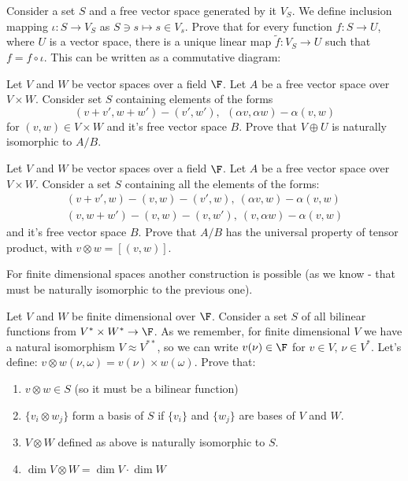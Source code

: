 \begin{prob}
  Consider a set $S$ and a free vector space generated by it $V_S$. We define inclusion mapping $\iota : S\to V_S$ as $S\ni s \mapsto s\in V_s$. Prove that for every function
  $f: S\to U$, where $U$ is a vector space, there is a unique linear map $\tilde f: V_S\to U$ such that $f=f\circ \iota$. This can be written as a commutative diagram:

  \begin{figure}
    \centering
  \end{figure}
\end{prob}

\begin{prob}
  Let $V$ and $W$ be vector spaces over a field $\F$. Let $A$ be a free vector space over $V\times W$.
  Consider set $S$ containing elements of the forms
  $$(v+v',w+w')-(v', w'),~~(\alpha v, \alpha w)-\alpha (v,w)$$
  for $(v,w) \in V\times W$ and it's free vector space $B$.
  Prove that $V\oplus U$ is naturally isomorphic to $A/B$.
\end{prob}

\begin{prob}
  Let $V$ and $W$ be vector spaces over a field $\F$. Let $A$ be a free vector space over $V\times W$. Consider a set $S$ containing all the elements of the forms:
  \begin{align}
    (v+v',w)-(v,w)-(v',w),~(\alpha v, w)-\alpha(v,w)\\
    (v,w+w')-(v,w)-(v,w'),~(v, \alpha w)-\alpha(v,w)
  \end{align}
  and it's free vector space $B$. Prove that $A/B$ has the universal property of tensor product, with $v\otimes w = [(v,w)]$.
\end{prob}

For finite dimensional spaces another construction is possible (as we know - that must be naturally isomorphic to the previous one).

\begin{prob}
  Let $V$ and $W$ be finite dimensional over $\F$.
  Consider a set $S$ of all bilinear functions from $V^*\times W^*\to \F$. As we remember, for finite dimensional $V$ we have a natural isomorphism $V\approx V^{**}$,
  so we can write $v(\nu)\in \F$ for $v\in V,\,\nu\in V^*$. Let's define: $v\otimes w(\nu, \omega) = v(\nu)\times w(\omega)$. Prove that:
  \begin{enumerate}
    \item $v\otimes w\in S$ (so it must be a bilinear function)
    \item $\{v_i\otimes w_j\}$ form a basis of $S$ if $\{v_i\}$ and $\{w_j\}$ are bases of $V$ and $W$.
    \item $V\otimes W$ defined as above is naturally isomorphic to $S$.
    \item $\dim V\otimes W = \dim V \cdot \dim W$
  \end{enumerate}
\end{prob}


